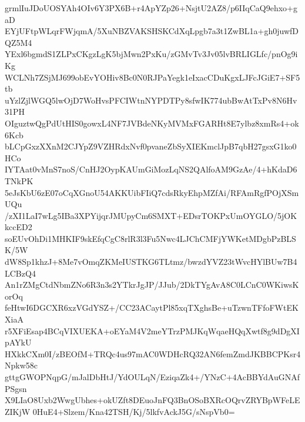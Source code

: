 grmlIuJDoUOSYAh4OIv6Y3PX6B+r4ApYZp26+NsjtU2AZ8/p6IIqCaQ9ehxo+gaD
EYjUFtpWLqrFWjqmA/5XuNBZVAKSHSKCdXqLpgb7a3t1ZwBL1a+gh0juwfDQZ5M4
YExl6bgmdS1ZLPxCKgzLgK5bjMwn2PxKu/zGMvTv3Jv05lvBRLIGLfc/pnOg9iKg
WCLNh7ZSjMJ699obEvYOHiv8Bc0N0RJPaYegk1eIxacCDuKgxLJFcJGiE7+SF5tb
uYzlZjlWGQ5lwOjD7WoHvsPFCIWtnNYPDTPy8sfwIK774ubBwAtTxPv8N6Hv31PH
OIguztwQgPdUtHIS0gowxL4NF7JVBdeNKyMVMxFGARHt8E7ylbz8xmRs4+ok6Kcb
bLCpGxzXXnM2CJYpZ9VZHRdxNvf0pvaneZbSyXIEKmclJpB7qbH27gsxG1ko0HCo
IYTAat0vMnS7noS/CnHJ2OypKAUmGiMozLqNS2QAlfoAM9GzAe/4+hKdaD6TNkPK
5eJsKbU6zE07oCqXGnoU54AKKUibFIiQ7cdsRkyEhpMZfAi/RFAmRgfPOjXSmUQu
/zXI1LaI7wLg5IBa3XPYijqrJMUpyCm6SMXT+EDsrTOKPxUmOYGLO/5jOKkccED2
soEUvOhDi1MHKIF9skEfqCgC8rlR3l3Fu5Nwc4LJChCMFjYWKetMDgbPzBLSK/5W
dW8Sp1khzJ+8Me7vOmqZKMeIUSTKG6TLtmz/bwzdYVZ23tWvcHYlBUw7B4LCBzQ4
An1rZMgCtdNbmZNo6R3n3s2YTkrJgJP/JJub/2DkTYgAvA8C0LCnC0WKiwsKorOq
feHtwI6DGCXR6xzVGdYSZ+/CC23ACaytPl85xqTXghsBe+uTzwnTFfoFWtEKXiaA
r5XFiEsap4BCqVIXUEKA+oEYaM4V2meYTrzPMJKqWqaeHQqXwtf8g9dDgXIpAYkU
HXkkCXm0I/zBEOfM+TRQc4us97mAC0WDHcRQ32AN6femZmdJKBBCPKsr4Npkw58c
gttgGWOPNqpG/mJalDbHtJ/YdOULqN/EziqaZk4+/YNzC+4AcBBYdAuGNAfPSgsn
X9LIaO8Uxb2WwgUbhes+okUZft8DEuoJnFQ3BnOSoBXRcOQrvZRYBpWFeLEZIKjW
0HuE4+Slzem/Kna42TSH/Kj/5lkfvAckJ5G/sNspVb0=
